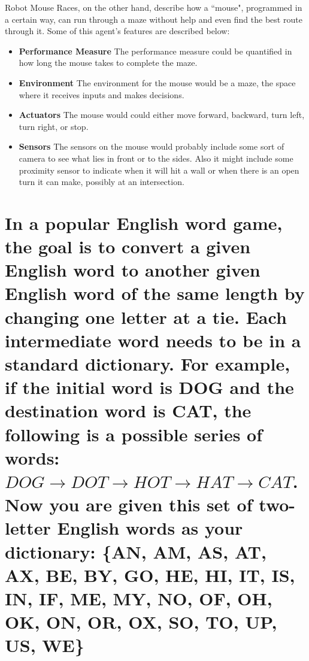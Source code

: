 \documentclass{article}
\begin{document}
Robot Mouse Races, on the other hand, describe how a ``mouse", programmed in a certain way, can run through 
a maze without help and even find the best route through it.  Some of this agent's features are described below:

\begin{itemize}
	\item \textbf{Performance Measure} The performance measure could be quantified in how long the mouse takes to 
			complete the maze. 
	\item \textbf{Environment} The environment for the mouse would be a maze, the space where it receives inputs
			and makes decisions.
	\item \textbf{Actuators} The mouse would could either move forward, backward, turn left, turn right,
			or stop. 
	\item \textbf{Sensors} The sensors on the mouse would probably include some sort of camera to see what lies
			in front or to the sides. Also it might include some proximity sensor to indicate when it will
			hit a wall or when there is an open turn it can make, possibly at an intersection.
\end{itemize}

\section{In a popular English word game, the goal is to convert a given English word to another given English
word of the same length by changing one letter at a tie. Each intermediate word needs to be in a standard 
dictionary. For example, if the initial word is DOG and the destination word is CAT, the following is a possible
series of words: $DOG\rightarrow DOT\rightarrow HOT\rightarrow HAT \rightarrow CAT$. 
Now you are given this set of two-letter English words as your 
dictionary: \{AN, AM, AS, AT, AX, BE, BY, GO, HE, HI, IT, IS, IN, IF, ME, MY, NO, OF, OH, OK, ON, OR,
OX, SO, TO, UP, US, WE\}}
\end{document}

